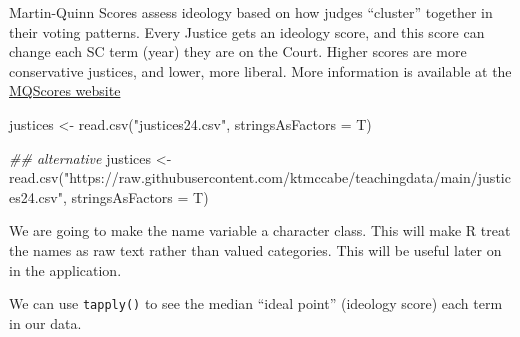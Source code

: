 \documentclass[
  letterpaper,
  DIV=11,
  numbers=noendperiod]{scrreprt}
\newenvironment{Shaded}{\begin{snugshade}}{\end{snugshade}}
\newcommand{\AttributeTok}[1]{\textcolor[rgb]{0.40,0.45,0.13}{#1}}
\newcommand{\DecValTok}[1]{\textcolor[rgb]{0.68,0.00,0.00}{#1}}
\newcommand{\DocumentationTok}[1]{\textcolor[rgb]{0.37,0.37,0.37}{\textit{#1}}}
\newcommand{\FloatTok}[1]{\textcolor[rgb]{0.68,0.00,0.00}{#1}}
\newcommand{\FunctionTok}[1]{\textcolor[rgb]{0.28,0.35,0.67}{#1}}
\newcommand{\NormalTok}[1]{\textcolor[rgb]{0.00,0.23,0.31}{#1}}
\newcommand{\OtherTok}[1]{\textcolor[rgb]{0.00,0.23,0.31}{#1}}
\newcommand{\SpecialCharTok}[1]{\textcolor[rgb]{0.37,0.37,0.37}{#1}}
\newcommand{\StringTok}[1]{\textcolor[rgb]{0.13,0.47,0.30}{#1}}
\begin{document}
Martin-Quinn Scores assess ideology based on how judges ``cluster''
together in their voting patterns. Every Justice gets an ideology score,
and this score can change each SC term (year) they are on the Court.
Higher scores are more conservative justices, and lower, more liberal.
More information is available at the
\href{http://mqscores.lsa.umich.edu/measures.php}{MQScores website}

\begin{Shaded}
\begin{Highlighting}[]
\NormalTok{justices }\OtherTok{\textless{}{-}} \FunctionTok{read.csv}\NormalTok{(}\StringTok{"justices24.csv"}\NormalTok{, }\AttributeTok{stringsAsFactors =}\NormalTok{ T)}

\DocumentationTok{\#\# alternative}
\NormalTok{justices }\OtherTok{\textless{}{-}} \FunctionTok{read.csv}\NormalTok{(}\StringTok{"https://raw.githubusercontent.com/ktmccabe/teachingdata/main/justices24.csv"}\NormalTok{, }\AttributeTok{stringsAsFactors =}\NormalTok{ T)}
\end{Highlighting}
\end{Shaded}

We are going to make the name variable a character class. This will make
R treat the names as raw text rather than valued categories. This will
be useful later on in the application.

\begin{Shaded}
\end{Shaded}

We can use \texttt{tapply()} to see the median ``ideal point'' (ideology
score) each term in our data.

\begin{Shaded}
\end{Shaded}
\end{document}
